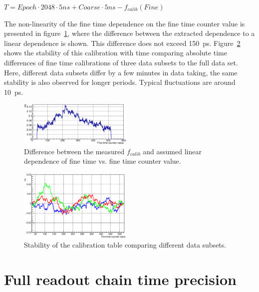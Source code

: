 \documentclass[final,5p,times,twocolumn]{elsarticle}
\begin{document}
{\centering
$ T = Epoch \cdot 2048 \cdot 5ns + Coarse \cdot 5ns - f_{calib}(Fine) $ \\
}

The non-linearity of the fine time dependence on the fine time counter value is presented in figure~\ref{fig:CalibTableMinusLinear}, where the difference between the extracted dependence to a linear dependence is shown. This difference does not exceed 150~ps. Figure~\ref{fig:CalibStability} shows the stability of this calibration with time comparing absolute time differences of fine time calibrations of three data subsets to the full data set. Here, different data subsets differ by a few minutes in data taking, the same stability is also observed for longer periods. Typical fluctuations are around 10~ps.

\begin{figure}[h]
	\centering
	\includegraphics[width=0.48\textwidth]{figures/FineMinusLinear2.eps}
	\caption{Difference between the measured $ f_{calib} $ and assumed linear dependence of fine time vs. fine time counter value.}
	\label{fig:CalibTableMinusLinear}
\end{figure}

\begin{figure}[h]
	\centering
	\includegraphics[width=0.48\textwidth]{figures/Stability_01_diff.eps}
	\caption{Stability of the calibration table comparing different data subsets.}
	\label{fig:CalibStability}
\end{figure}


\section{Full readout chain time precision}
\end{document}
